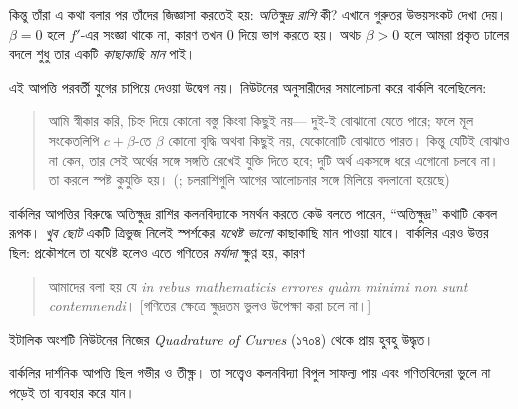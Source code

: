 \documentclass[../../../include/open-logic-section]{subfiles}
\begin{document}
কিন্তু তাঁরা এ কথা বলার
পর তাঁদের জিজ্ঞাসা করতেই
হয়: \emph{অতিক্ষুদ্র রাশি}
কী? এখানে গুরুতর উভয়সংকট
দেখা দেয়। $\beta = 0$
হলে $f'$-এর সংজ্ঞা থাকে
না, কারণ তখন $0$ দিয়ে
ভাগ করতে হয়। অথচ
$\beta > 0$ হলে আমরা
প্রকৃত ঢালের বদলে শুধু
তার একটি \emph{কাছাকাছি
মান} পাই।

এই আপত্তি পরবর্তী যুগের
চাপিয়ে দেওয়া উদ্বেগ নয়।
নিউটনের অনুসারীদের সমালোচনা
করে বার্কলি বলেছিলেন:
\begin{quote}
আমি স্বীকার করি, চিহ্ন দিয়ে
কোনো বস্তু কিংবা কিছুই নয়—
দুই-ই বোঝানো যেতে পারে;
ফলে মূল সংকেতলিপি
$c + \beta$-তে $\beta$
কোনো বৃদ্ধি অথবা কিছুই
নয়, যেকোনোটি বোঝাতে
পারত। কিন্তু যেটিই
বোঝাও না কেন, তার
সেই অর্থের সঙ্গে সঙ্গতি
রেখেই যুক্তি দিতে হবে;
দুটি অর্থ একসঙ্গে ধরে
এগোনো চলবে না। তা
করলে স্পষ্ট কুযুক্তি হয়।
(\citealt[\S{}XIII]{Berkeley1734};
চলরাশিগুলি আগের আলোচনার
সঙ্গে মিলিয়ে বদলানো হয়েছে)
\end{quote}
বার্কলির আপত্তির বিরুদ্ধে
অতিক্ষুদ্র রাশির কলনবিদ্যাকে
সমর্থন করতে কেউ বলতে পারেন,
“অতিক্ষুদ্র” কথাটি কেবল
রূপক। \emph{খুব ছোট}
একটি ত্রিভুজ নিলেই
স্পর্শকের \emph{যথেষ্ট
ভালো} কাছাকাছি মান
পাওয়া যাবে। বার্কলির
এরও উত্তর ছিল: প্রকৌশলে
তা যথেষ্ট হলেও এতে
গণিতের \emph{মর্যাদা}
ক্ষুণ্ণ হয়, কারণ
\begin{quote}
আমাদের বলা হয় যে
\emph{in rebus mathematicis errores quàm minimi
non sunt contemnendi}।
[গণিতের ক্ষেত্রে ক্ষুদ্রতম
ভুলও উপেক্ষা করা চলে
না।] \citep[\S{}IX]{Berkeley1734}
\end{quote}
ইটালিক অংশটি নিউটনের
নিজের \emph{Quadrature of
Curves} (১৭০৪) থেকে
প্রায় হুবহু উদ্ধৃত।

বার্কলির দার্শনিক আপত্তি
ছিল গভীর ও তীক্ষ্ণ।
তা সত্ত্বেও কলনবিদ্যা
বিপুল সাফল্য পায় এবং
গণিতবিদেরা ভুলে না
পড়েই তা ব্যবহার করে
যান।
\end{document}

